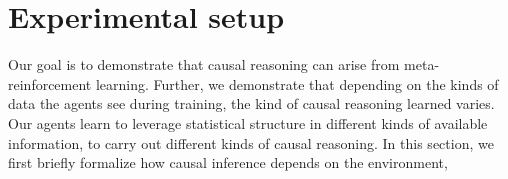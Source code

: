 \section{Experimental setup}
\label{sec:probspec}
Our goal is to demonstrate that causal reasoning can arise from meta-reinforcement learning. Further, we demonstrate that depending on the kinds of data the agents see during training, the kind of causal reasoning learned varies. Our agents learn to leverage statistical structure in different kinds of available information, to carry out different kinds of causal reasoning. In this section, we first briefly formalize how causal inference depends on the environment,



